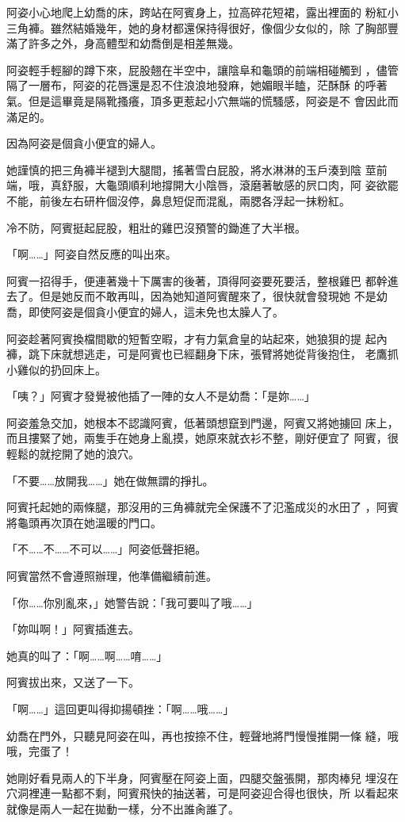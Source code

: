 阿姿小心地爬上幼喬的床，跨站在阿賓身上，拉高碎花短裙，露出裡面的
粉紅小三角褲。雖然結婚幾年，她的身材都還保持得很好，像個少女似的，除
了胸部豐滿了許多之外，身高體型和幼喬倒是相差無幾。

阿姿輕手輕腳的蹲下來，屁股翹在半空中，讓陰阜和龜頭的前端相碰觸到
，儘管隔了一層布，阿姿的花唇還是忍不住浪浪地發麻，她媚眼半瞌，茫酥酥
的呼著氣。但是這畢竟是隔靴搔癢，頂多更惹起小穴無端的慌騷感，阿姿是不
會因此而滿足的。

因為阿姿是個貪小便宜的婦人。

她謹慎的把三角褲半褪到大腿間，搖著雪白屁股，將水淋淋的玉戶湊到陰
莖前端，哦，真舒服，大龜頭順利地撐開大小陰唇，滾磨著敏感的屄口肉，阿
姿欲罷不能，前後左右研杵個沒停，鼻息短促而混亂，兩腮各浮起一抹粉紅。

冷不防，阿賓挺起屁股，粗壯的雞巴沒預警的鋤進了大半根。

「啊……」阿姿自然反應的叫出來。

阿賓一招得手，便連著幾十下厲害的後著，頂得阿姿要死要活，整根雞巴
都幹進去了。但是她反而不敢再叫，因為她知道阿賓醒來了，很快就會發現她
不是幼喬，即使阿姿是個貪小便宜的婦人，這未免也太臊人了。

阿姿趁著阿賓換檔間歇的短暫空暇，才有力氣倉皇的站起來，她狼狽的提
起內褲，跳下床就想逃走，可是阿賓也已經翻身下床，張臂將她從背後抱住，
老鷹抓小雞似的扔回床上。

「咦？」阿賓才發覺被他插了一陣的女人不是幼喬：「是妳……」

阿姿羞急交加，她根本不認識阿賓，低著頭想竄到門邊，阿賓又將她擄回
床上，而且摟緊了她，兩隻手在她身上亂摸，她原來就衣衫不整，剛好便宜了
阿賓，很輕鬆的就挖開了她的浪穴。

「不要……放開我……」她在做無謂的掙扎。

阿賓托起她的兩條腿，那沒用的三角褲就完全保護不了氾濫成災的水田了
，阿賓將龜頭再次頂在她溫暖的門口。

「不……不……不可以……」阿姿低聲拒絕。

阿賓當然不會遵照辦理，他準備繼續前進。

「你……你別亂來，」她警告說：「我可要叫了哦……」

「妳叫啊！」阿賓插進去。

她真的叫了：「啊……啊……唷……」

阿賓拔出來，又送了一下。

「啊……」這回更叫得抑揚頓挫：「啊……哦……」

幼喬在門外，只聽見阿姿在叫，再也按捺不住，輕聲地將門慢慢推開一條
縫，哦哦，完蛋了！

她剛好看見兩人的下半身，阿賓壓在阿姿上面，四腿交盤張開，那肉棒兒
埋沒在穴洞裡連一點都不剩，阿賓飛快的抽送著，可是阿姿迎合得也很快，所
以看起來就像是兩人一起在拋動一樣，分不出誰肏誰了。

